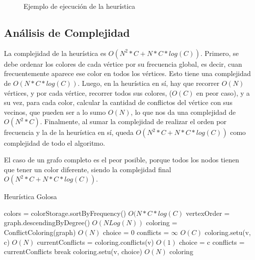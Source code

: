 \documentclass{article}
\theoremstyle{definition}
\theoremstyle{remark}
\begin{document}
\begin{figure}
\begin{minipage}{1\textwidth}
\begin{tabular}{cccc}
        \end{tabular}
    \end{minipage}
    \caption{Ejemplo de ejecución de la heurística\label{grf:ex3-example-1}}
\end{figure}


\subsection{Análisis de Complejidad}

La complejidad de la heurística es $O(N^{2}*C + N*C*log(C))$.
Primero, se debe ordenar los colores de cada vértice por su frecuencia global, es decir, cuan frecuentemente aparece ese color en todos los vértices. Esto tiene una complejidad de $O(N*C*log(C))$.
Luego, en la heurística en sí, hay que recorrer $O(N)$ vértices, y por cada vértice, recorrer todos sus colores, ($O(C)$ en peor caso), y a su vez, para cada color, calcular la cantidad de conflictos del vértice con sus vecinos, que pueden ser a lo sumo $O(N)$, lo que nos da una complejidad de $O(N^{2}*C)$.
Finalmente, al sumar la complejidad de realizar el orden por frecuencia y la de la heurística en sí, queda $O(N^{2}*C + N*C*log(C))$ como complejidad de todo el algoritmo.

El caso de un grafo completo es el peor posible, porque todos los nodos tienen que tener un color diferente, siendo la complejidad final $O(N^{2}*C + N*C*log(C))$.

\begin{algorithm}
\caption{Heurística Golosa}
\begin{algorithmic}
\State colors = colorStorage.sortByFrequency() \Comment $O(N*C*log(C)$
\State vertexOrder = graph.descendingByDegree() \Comment $O(N Log(N))$
\State coloring = ConflictColoring(graph)
  \Comment $O(N)$
    \State choice = 0
    \State conflicts = $\infty$
            \Comment $O(C)$
        \State coloring.setu(v, c) \Comment $O(N)$
        \State currentConflicts = coloring.conflicts(v) \Comment $O(1)$
            \State choice = c
            \State conflicts = currentConflicts
                \State break
            \EndIf
        \EndIf
    \EndFor
    \State coloring.setu(v, choice) \Comment $O(N)$
\EndFor
\State \Return coloring
\EndFunction
\end{algorithmic}
\end{algorithm}
\end{document}

